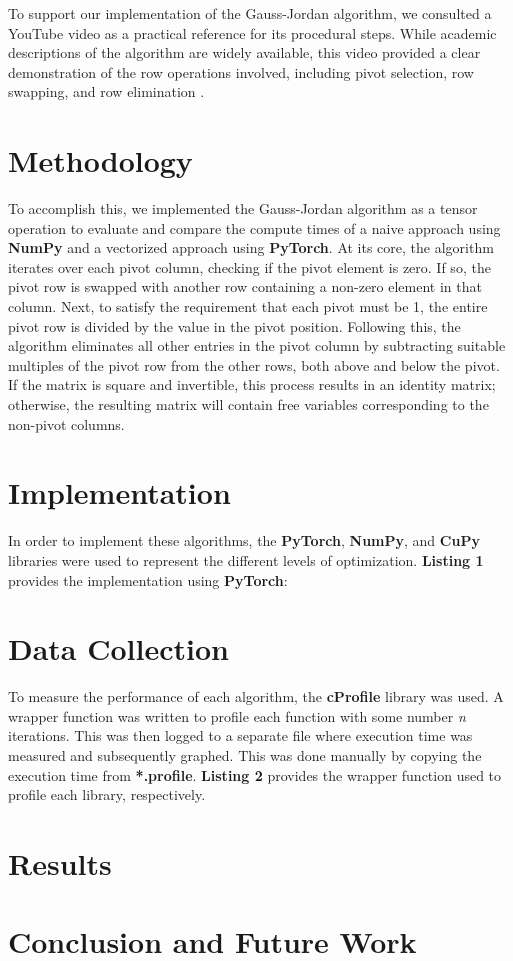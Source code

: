 \documentclass[12pt]{article}
\begin{document}
To support our implementation of the Gauss-Jordan algorithm, we consulted a YouTube video as a practical reference for its procedural steps. While academic descriptions of the algorithm are widely available, this video provided a clear demonstration of the row operations involved, including pivot selection, row swapping, and row elimination \cite{gaussjordan_video}.

\section{Methodology}

To accomplish this, we implemented the Gauss-Jordan algorithm as a tensor operation to evaluate and compare the compute times of a naive approach using \textbf{NumPy} and a vectorized approach using \textbf{PyTorch}. At its core, the algorithm iterates over each pivot column, checking if the pivot element is zero. If so, the pivot row is swapped with another row containing a non-zero element in that column. Next, to satisfy the requirement that each pivot must be 1, the entire pivot row is divided by the value in the pivot position. Following this, the algorithm eliminates all other entries in the pivot column by subtracting suitable multiples of the pivot row from the other rows, both above and below the pivot. If the matrix is square and invertible, this process results in an identity matrix; otherwise, the resulting matrix will contain free variables corresponding to the non-pivot columns.

\section{Implementation}

In order to implement these algorithms, the \textbf{PyTorch}, \textbf{NumPy}, and \textbf{CuPy} libraries were used to represent the different levels of optimization. \textbf{Listing 1} provides the implementation using \textbf{PyTorch}:
\hfill\break

\lstset{style=mystyle}



\section{Data Collection}
To measure the performance of each algorithm, the \textbf{cProfile} library was used. A wrapper function was written to profile each function with some number \textit{n} iterations. This was then logged to a separate file where execution time was measured and subsequently graphed. This was done manually by copying the execution time from \textbf{*.profile}. \textbf{Listing 2} provides the wrapper function used to profile each library, respectively.
\hfill\break



\section{Results}

\section{Conclusion and Future Work}

\newpage


\end{document}
